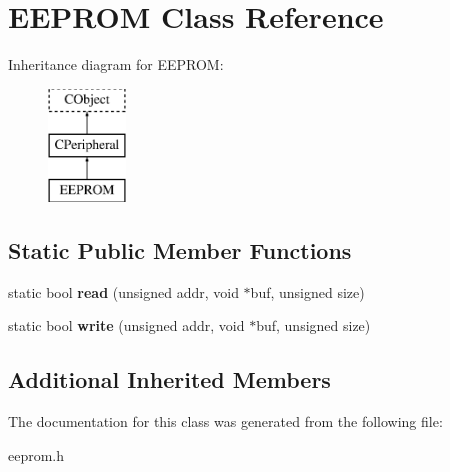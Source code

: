 \hypertarget{class_e_e_p_r_o_m}{\section{E\-E\-P\-R\-O\-M Class Reference}
\label{class_e_e_p_r_o_m}
}
Inheritance diagram for E\-E\-P\-R\-O\-M\-:\begin{figure}[H]
\begin{center}
\leavevmode
\includegraphics[height=3.000000cm]{class_e_e_p_r_o_m}
\end{center}
\end{figure}
\subsection*{Static Public Member Functions}
\begin{DoxyCompactItemize}
\item 
\hypertarget{class_e_e_p_r_o_m_a47f3f52eed97b6e43b830ce4a1dc495e}{static bool {\bfseries read} (unsigned addr, void $\ast$buf, unsigned size)}\label{class_e_e_p_r_o_m_a47f3f52eed97b6e43b830ce4a1dc495e}

\item 
\hypertarget{class_e_e_p_r_o_m_a8c397be98d4762869715a2a07866af6b}{static bool {\bfseries write} (unsigned addr, void $\ast$buf, unsigned size)}\label{class_e_e_p_r_o_m_a8c397be98d4762869715a2a07866af6b}

\end{DoxyCompactItemize}
\subsection*{Additional Inherited Members}


The documentation for this class was generated from the following file\-:\begin{DoxyCompactItemize}
\item 
eeprom.\-h\end{DoxyCompactItemize}
